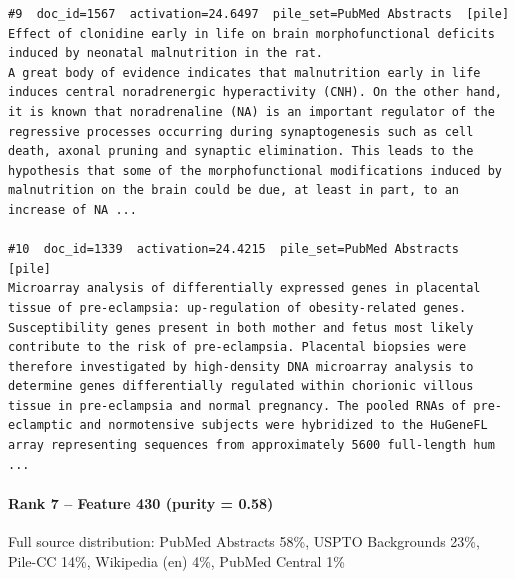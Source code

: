 \begin{verbatim}
#9  doc_id=1567  activation=24.6497  pile_set=PubMed Abstracts  [pile]
Effect of clonidine early in life on brain morphofunctional deficits induced by neonatal malnutrition in the rat.
A great body of evidence indicates that malnutrition early in life induces central noradrenergic hyperactivity (CNH). On the other hand, it is known that noradrenaline (NA) is an important regulator of the regressive processes occurring during synaptogenesis such as cell death, axonal pruning and synaptic elimination. This leads to the hypothesis that some of the morphofunctional modifications induced by malnutrition on the brain could be due, at least in part, to an increase of NA ...

#10  doc_id=1339  activation=24.4215  pile_set=PubMed Abstracts  [pile]
Microarray analysis of differentially expressed genes in placental tissue of pre-eclampsia: up-regulation of obesity-related genes.
Susceptibility genes present in both mother and fetus most likely contribute to the risk of pre-eclampsia. Placental biopsies were therefore investigated by high-density DNA microarray analysis to determine genes differentially regulated within chorionic villous tissue in pre-eclampsia and normal pregnancy. The pooled RNAs of pre-eclamptic and normotensive subjects were hybridized to the HuGeneFL array representing sequences from approximately 5600 full-length hum ...

\end{verbatim}

\paragraph*{Rank 7 -- Feature 430 (purity = 0.58)}

Full source distribution: PubMed Abstracts 58\%, USPTO Backgrounds 23\%, Pile-CC 14\%, Wikipedia (en) 4\%, PubMed Central 1\%

